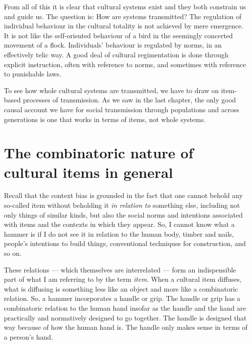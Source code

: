 From all of this it is clear that cultural systems exist and they both 
constrain us and guide us. The question is: How are systems transmitted? The regulation of individual behaviour in the cultural 
totality is not achieved by mere emergence. It is not like the self-oriented behaviour of a bird 
in the seemingly concerted movement of a flock. Individuals' behaviour 
is regulated by norms, in an effectively telic way. A good deal of 
cultural regimentation is done through explicit instruction, often with 
reference to norms, and sometimes with reference to punishable laws. 



To see how whole cultural systems are transmitted, we have to draw on item-based processes of transmission. As we 
saw in the last chapter, the only good causal account we have for social 
transmission through populations and across generations is one that 
works in terms of items, not whole systems.



\section{The combinatoric nature of cultural items in general}


Recall that the context bias is grounded in the fact that one cannot 
behold any so-called item without beholding it \textit{in relation to}
something else, including not only things of similar kinds, but also the social norms and intentions associated with items and 
the contexts in which they appear. So, I cannot know what a hammer is if I do not see it in relation to the human body, 
timber and nails, people's intentions to build things, conventional 
techniques for construction, and so on. 



These relations --- which themselves are interrelated --- form an indispensible 
part of what I am referring to by the term \textit{item}. When a cultural item 
diffuses, what is diffusing is something less like an object 
and more like a combinatoric relation. So, a hammer incorporates a 
handle or grip. The handle or grip has a combinatoric relation to the 
human hand insofar as the handle and the hand are practically and 
normatively designed to go together. The handle is designed that way 
because of how the human hand is. The handle only makes sense in terms 
of a person's hand. 



